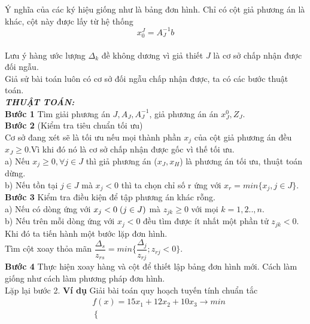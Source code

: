 \documentclass[12pt,a4paper]{report}
\begin{document}
\begin{itemize}
\begin{tabular}{|c|c|c|c|c|c|c|c|c|}
    \end{tabular}\\
    \\
    Ý nghĩa của các ký hiệu giống như là bảng đơn hình. Chỉ có cột giả phương án là khác, cột này được lấy từ hệ thống \\
    $$x_0^J=A_J^{-1}b$$\\
    Lưu ý hàng ước lượng $\Delta_k$ đề không dương vì giả thiết $J$ là cơ sở chấp nhận được đối ngẫu.\\ 
    Giả sử bài toán luôn có cơ sở đối ngẫu chấp nhận được, ta có các bước thuật toán.\\
    \textbf{\textit{THUẬT TOÁN:}}\\
    \textbf{Bước 1} Tìm giải phương án $J,A_J, A_J^{-1}$, giả phương án án $x_J^0,Z_J.$\\
    \textbf{Bước 2} (Kiểm tra tiêu chuẩn tối ưu)\\
    Cơ sở đang xét sẽ là tối ưu nếu mọi thành phần $x_j$ của cột giả phương án đều $x_J \ge 0$.Vì khi đó nó là cơ sở chấp nhận được gốc vì thế tối ưu.\\
    a) Nếu $x_j\ge 0, \forall j \in J$ thì giả phương án ($x_J,x_H$) là phương án tối ưu, thuật toán dừng.\\
    b) Nếu tồn tại $j \in J$ mà $x_j <0 $ thì ta chọn chỉ số r ứng với \textbf{$x_r=min \{x_j, j \in J\}$}.\\ 
    \textbf{Bước 3} Kiểm tra điều kiện để tập phương án khác rỗng.\\
    a) Nếu có dòng ứng với $x_j <0 \hspace{0.1cm}(j \in J)$ mà $z_{jk}\ge 0 $ với mọi $k=1,2..,n$.\\
    b) Nếu trên mỗi dòng ứng với $x_j <0$ đều tìm được ít nhất một phần tử $z_{jk} <0$. Khi đó ta tiến hành một bước lặp đơn hình.\\
    Tìm cột xoay thỏa mãn $\dfrac{\Delta_s}{z_{rs}}=min \biggl\{ \dfrac{\Delta_j}{z_{rj}}; z_{rj} <0 \biggl\}$.\\
    \textbf{Bước 4} Thực hiện xoay hàng và cột để thiết lập bảng đơn hình mới. Cách làm giống như cách làm phương pháp đơn hình.\\
    Lặp lại bước 2.
    \textbf{Ví dụ }
         Giải bài toán quy hoạch tuyến tính chuẩn tắc\\
    \begin{equation*}
        \begin{split}
            &f(x)=15x_1+12x_2+10x_3 \longrightarrow min\\
            & \left\{\begin{split}

\end{split}
\end{split}
\end{equation*}
\end{itemize}
\end{document}
